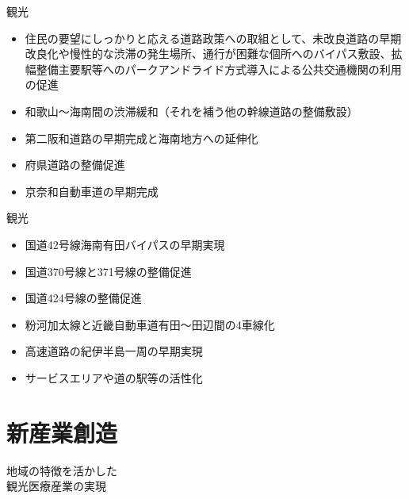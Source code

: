\documentclass[dvipdfmx]{beamer}
\begin{document}
    \begin{frame}{観光}{}
        \begin{small}
            \begin{itemize}
                \setlength{\parsep}{.5mm}
                \setlength{\itemsep}{2mm}
                \item 住民の要望にしっかりと応える道路政策への取組として、未改良道路の早期改良化や慢性的な渋滞の発生場所、通行が困難な個所へのバイパス敷設、拡幅整備主要駅等へのパークアンドライド方式導入による公共交通機関の利用の促進
                \item 和歌山～海南間の渋滞緩和（それを補う他の幹線道路の整備敷設）
                \item 第二阪和道路の早期完成と海南地方への延伸化
                \item 府県道路の整備促進
                \item 京奈和自動車道の早期完成
            \end{itemize}
        \end{small}
    \end{frame}

    \begin{frame}{観光}{}
        \begin{small}
            \begin{itemize}
                \setlength{\parsep}{.5mm}
                \setlength{\itemsep}{2mm}
                \item 国道42号線海南有田バイパスの早期実現
                \item 国道370号線と371号線の整備促進
                \item 国道424号線の整備促進
                \item 粉河加太線と近畿自動車道有田～田辺間の4車線化
                \item 高速道路の紀伊半島一周の早期実現
                \item サービスエリアや道の駅等の活性化
            \end{itemize}
        \end{small}
    \end{frame}

\section{新産業創造}
    \begin{frame}{}{}
        \sectionpage
        \begin{center}
            \begin{large}
                \alert{地域の特徴を活かした}\\\alert{観光医療産業の実現}
            \end{large}
        \end{center}
    \end{frame}
\end{document}
